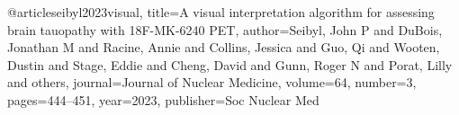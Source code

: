 @article{seibyl2023visual,
  title={A visual interpretation algorithm for assessing brain tauopathy with 18F-MK-6240 PET},
  author={Seibyl, John P and DuBois, Jonathan M and Racine, Annie and Collins, Jessica and Guo, Qi and Wooten, Dustin and Stage, Eddie and Cheng, David and Gunn, Roger N and Porat, Lilly and others},
  journal={Journal of Nuclear Medicine},
  volume={64},
  number={3},
  pages={444--451},
  year={2023},
  publisher={Soc Nuclear Med}
}